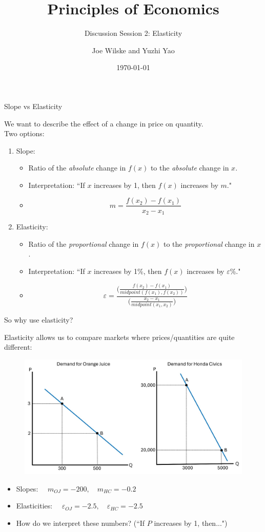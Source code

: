 \documentclass[9pt, handout]{beamer}
\title{Principles of Economics}
\subtitle{Discussion Session 2: Elasticity}
\author{Joe Wilske and Yuzhi Yao}
\institute{Boston College}
\date{\today}
\begin{document}
\frame{\titlepage}

\begin{frame}{Slope vs Elasticity}

    We want to describe the effect of a change in price on quantity.\\

    Two options:
    \begin{enumerate}
        \item Slope:
        \begin{itemize}
            \item Ratio of the \textit{absolute} change in $f(x)$ to the \textit{absolute} change in $x$.
            \item Interpretation: ``If $x$ increases by 1, then $f(x)$ increases by $m$."
            \item \[m = \frac{f(x_2) - f(x_1)}{x_2 - x_1}\]
        \end{itemize}
        \item Elasticity:
        \begin{itemize}
            \item Ratio of the \textit{proportional} change in $f(x)$ to the \textit{proportional} change in $x$.
            \item Interpretation: ``If $x$ increases by 1\%, then $f(x)$ increases by $\varepsilon$\%."
            \item \[\varepsilon = \frac{\Big(\frac{f(x_2) - f(x_1)}{midpoint(f(x_1), f(x_2))}\Big)}{\Big(\frac{x_2 - x_1}{midpoint(x_1, x_2)}\Big)}\]
        \end{itemize}
    \end{enumerate}
\end{frame}

\begin{frame}{So why use elasticity?}

    Elasticity allows us to compare markets where prices/quantities are quite different:
    \begin{figure}
        \centering
        \includegraphics[width=.8\linewidth]{demand_curve_comparison.jpg}
        \label{fig:demand_curve_comparison}
    \end{figure}
    \begin{itemize}
        \item Slopes: $\quad m_{OJ} = -200, \quad m_{HC} = -0.2$
        \item Elasticities: $\quad \varepsilon_{OJ} = -2.5, \quad \varepsilon_{HC} = -2.5$
        \item How do we interpret these numbers? (``If $P$ increases by 1, then...")
    \end{itemize}
\end{frame}
\end{document}
